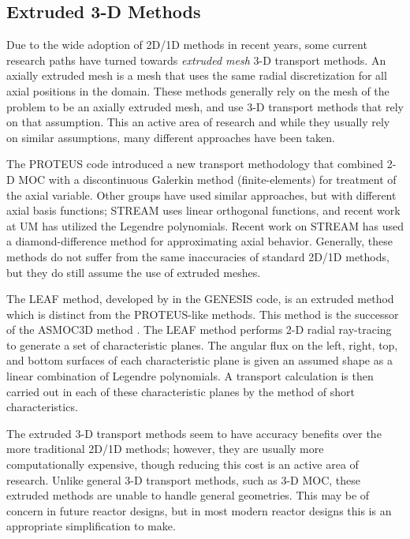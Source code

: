 {{    %
    
    
    

    \subsection{Extruded 3-D Methods}{\label{ssec:3T:Extruded 3-D Methods}
      Due to the wide adoption of 2D/1D methods in recent years, some current research paths have turned towards \emph{extruded mesh} 3-D transport methods.
      An axially extruded mesh is a mesh that uses the same radial discretization for all axial positions in the domain.
      These methods generally rely on the mesh of the problem to be an axially extruded mesh, and use 3-D transport methods that rely on that assumption.
      This an active area of research and while they usually rely on similar assumptions, many different approaches have been taken.

      The PROTEUS \cite{Marin-Lafleche2013} code introduced a new transport methodology that combined 2-D \ac{MOC} with a discontinuous Galerkin method (finite-elements) for treatment of the axial variable.
      Other groups have used similar approaches, but with different axial basis functions; STREAM \cite{Zheng2017} uses linear orthogonal functions, and recent work at \ac{UM} \cite{HerringExtruded} has utilized the Legendre polynomials.
      Recent work on STREAM has used a diamond-difference method for approximating axial behavior.%
      Generally, these methods do not suffer from the same inaccuracies of standard 2D/1D methods, but they do still assume the use of extruded meshes.

      The \acf{LEAF} method, developed by \citet{Yamamoto2017} in the GENESIS code, is an extruded method which is distinct from the PROTEUS-like methods.
      This method is the successor of the ASMOC3D method \cite{Giho2008}.
      The \ac{LEAF} method performs 2-D radial ray-tracing to generate a set of characteristic planes.
      The angular flux on the left, right, top, and bottom surfaces of each characteristic plane is given an assumed shape as a linear combination of Legendre polynomials.
      A transport calculation is then carried out in each of these characteristic planes by the method of short characteristics.

      The extruded 3-D transport methods seem to have accuracy benefits over the more traditional 2D/1D methods;
        however, they are usually more computationally expensive, though reducing this cost is an active area of research.
      Unlike general 3-D transport methods, such as 3-D \ac{MOC}, these extruded methods are unable to handle general geometries.
      This may be of concern in future reactor designs, but in most modern reactor designs this is an appropriate simplification to make.
    }
  }

}
